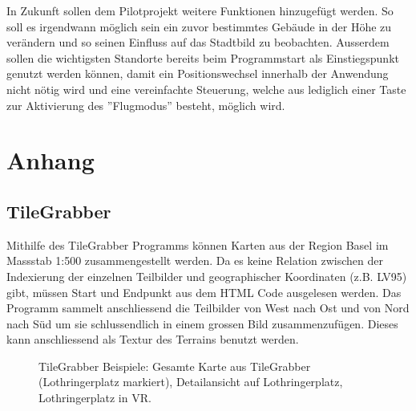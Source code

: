  In Zukunft sollen dem Pilotprojekt weitere Funktionen hinzugefügt werden. So soll es irgendwann möglich sein ein zuvor bestimmtes Gebäude in der Höhe zu verändern und so seinen Einfluss auf das Stadtbild zu beobachten. Ausserdem sollen die wichtigsten Standorte bereits beim Programmstart als Einstiegspunkt genutzt werden können, damit ein Positionswechsel innerhalb der Anwendung nicht nötig wird und eine vereinfachte Steuerung, welche aus lediglich einer Taste zur Aktivierung des ''Flugmodus'' besteht, möglich wird.
\chapter{Anhang}\label{c.anhang}
\vspace{-20pt}
\section{TileGrabber}\label{s.tilegrabber}
Mithilfe des TileGrabber Programms können Karten aus der Region Basel im Massstab 1:500 zusammengestellt werden. Da es keine Relation zwischen der Indexierung der einzelnen Teilbilder und geographischer Koordinaten (z.B. LV95) gibt, müssen Start und Endpunkt aus dem HTML Code ausgelesen werden. Das Programm sammelt anschliessend die Teilbilder von West nach Ost und von Nord nach Süd um sie schlussendlich in einem grossen Bild zusammenzufügen. Dieses kann anschliessend als Textur des Terrains benutzt werden.

\renewcommand{\baselinestretch}{1}\normalsize

\renewcommand{\baselinestretch}{1.5}\normalsize
\begin{figure}[htp]%
	\centering
	\hspace{8pt}%
	
	\hspace{48pt}%
	\hspace{8pt}%

	\caption[TileGrabber Beispiele.]
	{TileGrabber Beispiele:
		 Gesamte Karte aus TileGrabber (Lothringerplatz markiert),
		 Detailansicht auf Lothringerplatz,
		 Lothringerplatz in VR.}%
\end{figure}


